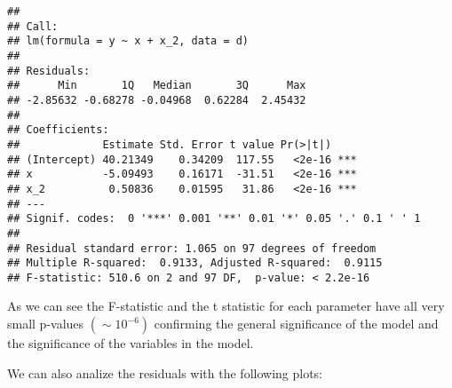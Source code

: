 \documentclass[
]{article}
\newenvironment{Shaded}{\begin{snugshade}}{\end{snugshade}}
\newcommand{\AttributeTok}[1]{\textcolor[rgb]{0.77,0.63,0.00}{#1}}
\newcommand{\DecValTok}[1]{\textcolor[rgb]{0.00,0.00,0.81}{#1}}
\newcommand{\FunctionTok}[1]{\textcolor[rgb]{0.00,0.00,0.00}{#1}}
\newcommand{\NormalTok}[1]{#1}
\newcommand{\SpecialCharTok}[1]{\textcolor[rgb]{0.00,0.00,0.00}{#1}}
\newcommand{\StringTok}[1]{\textcolor[rgb]{0.31,0.60,0.02}{#1}}
\begin{document}
\begin{verbatim}
## 
## Call:
## lm(formula = y ~ x + x_2, data = d)
## 
## Residuals:
##      Min       1Q   Median       3Q      Max 
## -2.85632 -0.68278 -0.04968  0.62284  2.45432 
## 
## Coefficients:
##             Estimate Std. Error t value Pr(>|t|)    
## (Intercept) 40.21349    0.34209  117.55   <2e-16 ***
## x           -5.09493    0.16171  -31.51   <2e-16 ***
## x_2          0.50836    0.01595   31.86   <2e-16 ***
## ---
## Signif. codes:  0 '***' 0.001 '**' 0.01 '*' 0.05 '.' 0.1 ' ' 1
## 
## Residual standard error: 1.065 on 97 degrees of freedom
## Multiple R-squared:  0.9133, Adjusted R-squared:  0.9115 
## F-statistic: 510.6 on 2 and 97 DF,  p-value: < 2.2e-16
\end{verbatim}

As we can see the F-statistic and the t statistic for each parameter
have all very small p-values \((\sim10^{-6})\) confirming the general
significance of the model and the significance of the variables in the
model.

We can also analize the residuals with the following plots:

\begin{Shaded}
\end{Shaded}
\end{document}
